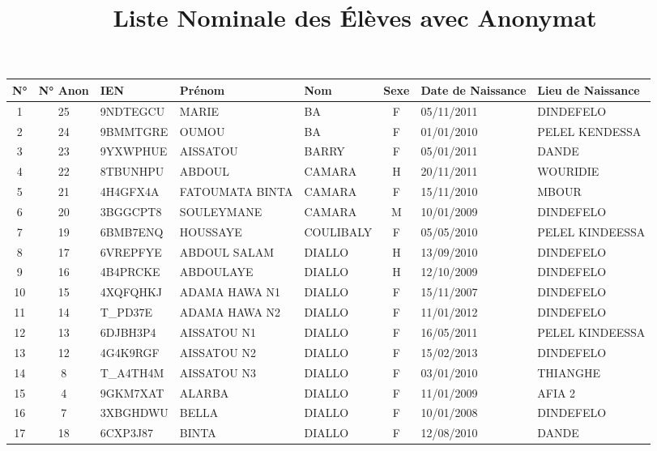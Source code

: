 \documentclass[10pt,a4paper]{article}
\title{Liste Nominale des Élèves avec Anonymat}
\date{}
\begin{document}
\maketitle

\noindent
\begin{center}
\small
\begin{tabular}{cclllcll}
\toprule
\textbf{N°} & \textbf{N° Anon} & \textbf{IEN} & \textbf{Prénom} & \textbf{Nom} & \textbf{Sexe} & \textbf{Date de Naissance} & \textbf{Lieu de Naissance} \\
\midrule
1  & 25 & 9NDTEGCU  & MARIE            & BA        & F & 05/11/2011 & DINDEFELO \\
2  & 24 & 9BMMTGRE  & OUMOU            & BA        & F & 01/01/2010 & PELEL KENDESSA \\
3  & 23 & 9YXWPHUE  & AISSATOU         & BARRY     & F & 05/01/2011 & DANDE \\
4  & 22 & 8TBUNHPU  & ABDOUL           & CAMARA    & H & 20/11/2011 & WOURIDIE \\
5  & 21 & 4H4GFX4A  & FATOUMATA BINTA  & CAMARA    & F & 15/11/2010 & MBOUR \\
6  & 20 & 3BGGCPT8  & SOULEYMANE       & CAMARA    & M & 10/01/2009 & DINDEFELO \\
7  & 19 & 6BMB7ENQ  & HOUSSAYE         & COULIBALY & F & 05/05/2010 & PELEL KINDEESSA \\
8  & 17 & 6VREPFYE  & ABDOUL SALAM     & DIALLO    & H & 13/09/2010 & DINDEFELO \\
9  & 16 & 4B4PRCKE  & ABDOULAYE        & DIALLO    & H & 12/10/2009 & DINDEFELO \\
10 & 15 & 4XQFQHKJ  & ADAMA HAWA N1    & DIALLO    & F & 15/11/2007 & DINDEFELO \\
11 & 14 & T\_PD37E   & ADAMA HAWA N2    & DIALLO    & F & 11/01/2012 & DINDEFELO \\
12 & 13 & 6DJBH3P4  & AISSATOU N1      & DIALLO    & F & 16/05/2011 & PELEL KINDEESSA \\
13 & 12 & 4G4K9RGF  & AISSATOU N2      & DIALLO    & F & 15/02/2013 & DINDEFELO \\
14 & 8 & T\_A4TH4M  & AISSATOU N3      & DIALLO    & F & 03/01/2010 & THIANGHE \\
15 & 4 & 9GKM7XAT  & ALARBA           & DIALLO    & F & 11/01/2009 & AFIA 2 \\
16 & 7 & 3XBGHDWU  & BELLA            & DIALLO    & F & 10/01/2008 & DINDEFELO \\
17 & 18 & 6CXP3J87  & BINTA            & DIALLO    & F & 12/08/2010 & DANDE \\

\end{tabular}
\end{center}
\end{document}
